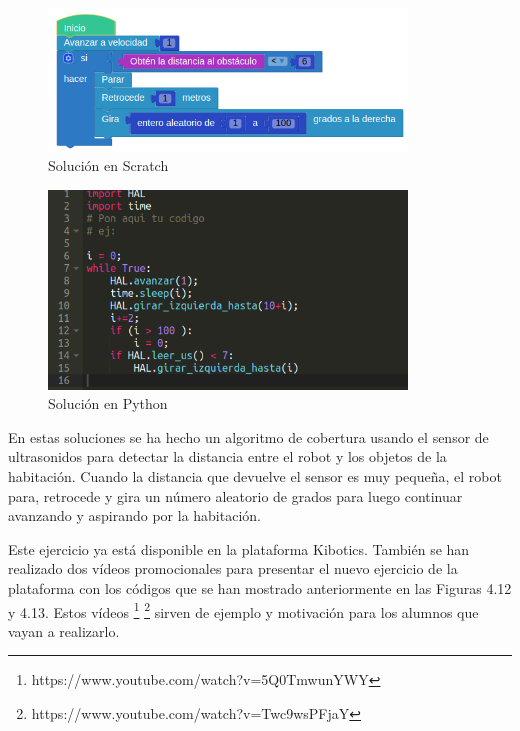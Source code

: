 \begin{figure}[H]
    \centering
    \includegraphics[width=0.85\textwidth, height=0.3\textwidth]{chapters/images/solucionroombascratch.png}
    \caption{Solución en Scratch }
    \label{fig:my_label}
\end{figure}
\begin{figure}[H]
    \centering
    \includegraphics[width=0.85\textwidth, height=0.4\textwidth]{chapters/images/solucionroombapython.png}
    \caption{Solución en Python}
    \label{fig:my_label}
\end{figure}

En estas soluciones se ha hecho un algoritmo de cobertura usando el sensor de ultrasonidos para detectar la distancia entre el robot y los objetos de la habitación. Cuando la distancia que devuelve el sensor es muy pequeña, el robot para, retrocede y gira un número aleatorio de grados para luego continuar avanzando y aspirando por la habitación.

Este ejercicio ya está disponible en la plataforma Kibotics. También se han realizado dos vídeos promocionales para presentar el nuevo ejercicio de la plataforma con los códigos que se han mostrado anteriormente en las Figuras 4.12 y 4.13. Estos vídeos \footnote{https://www.youtube.com/watch?v=5Q0TmwunYWY} \footnote{https://www.youtube.com/watch?v=Twc9wsPFjaY} sirven de ejemplo y motivación para los alumnos que vayan a realizarlo.